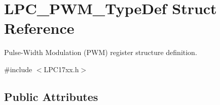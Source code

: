 \hypertarget{struct_l_p_c___p_w_m___type_def}{\section{\-L\-P\-C\-\_\-\-P\-W\-M\-\_\-\-Type\-Def \-Struct \-Reference}
\label{struct_l_p_c___p_w_m___type_def}
}


\-Pulse-\/\-Width \-Modulation (\-P\-W\-M) register structure definition.  




{\ttfamily \#include $<$\-L\-P\-C17xx.\-h$>$}

\subsection*{\-Public \-Attributes}
